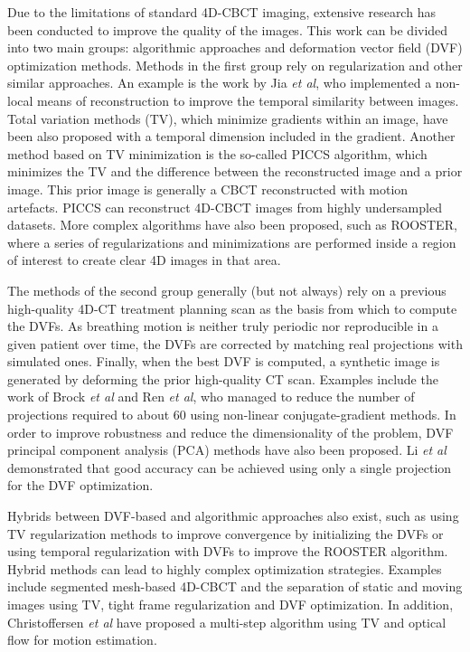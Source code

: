 Due to the limitations of standard 4D-CBCT imaging, extensive research has been conducted to improve the quality of the images.  This work can be divided into two main groups: algorithmic approaches and deformation vector field (DVF) optimization methods.  Methods in the first group rely on regularization and other similar approaches.  An example is the work by Jia \textit{et al}\cite{jia2012}, who implemented a non-local means of reconstruction to improve the temporal similarity between images.  Total variation methods (TV)\cite{ASD_POCS}, which minimize gradients within an image, have been also proposed with a temporal dimension included in the gradient\cite{0031-9155-57-6-1517}.  Another method based on TV minimization is the so-called PICCS algorithm\cite{chen2008prior}\cite{0031-9155-53-20-006}\cite{chen2012time}, which minimizes the TV and the difference between the reconstructed image and a prior image.  This prior image is generally a CBCT reconstructed with motion artefacts.  PICCS can reconstruct 4D-CBCT images from highly undersampled datasets.  More complex algorithms have also been proposed, such as ROOSTER\cite{:/content/aapm/journal/medphys/41/2/10.1118/1.4860215}, where a series of regularizations and minimizations are performed inside a region of interest to create clear 4D images in that area.

The methods of the second group generally (but not always) rely on a previous high-quality 4D-CT treatment planning scan as the basis from which to compute the DVFs.  As breathing motion is neither truly periodic nor reproducible in a given patient over time, the DVFs are corrected by matching real projections with simulated ones.  Finally, when the best DVF is computed, a synthetic image is generated by deforming the prior high-quality CT scan.  Examples include the work of Brock \textit{et al}\cite{brock2010} and Ren \textit{et al}\cite{Ren20121584}, who managed to reduce the number of projections required to about 60 using non-linear conjugate-gradient methods.  In order to improve robustness and reduce the dimensionality of the problem, DVF principal component analysis (PCA) methods have also been proposed\cite{zhang2010correction}.  Li \textit{et al}\cite{:/content/aapm/journal/medphys/37/6/10.1118/1.3426002}\cite{:/content/aapm/journal/medphys/38/5/10.1118/1.3582693} demonstrated that good accuracy can be achieved using only a single projection for the DVF optimization.

Hybrids between DVF-based and algorithmic approaches also exist, such as using TV regularization methods to improve convergence by initializing the DVFs\cite{wang2012high} or using temporal regularization with DVFs to improve the ROOSTER algorithm\cite{mory2016motion}.  Hybrid methods can lead to highly complex optimization strategies.  Examples include segmented mesh-based 4D-CBCT\cite{0031-9155-61-3-996} and the separation of static and moving images using TV, tight frame regularization and DVF optimization\cite{0031-9155-56-11-002}.  In addition, Christoffersen \textit{et al}\cite{christoffersen2013registration} have proposed a multi-step algorithm using TV and optical flow for motion estimation.

